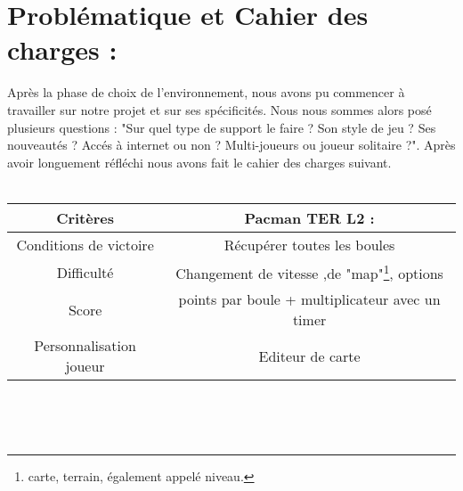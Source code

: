 \documentclass[12pt,a4paper,article]{article} %
\begin{document}
\section{Problématique et Cahier des charges :}

Après la phase de choix de l'environnement, nous avons pu commencer à travailler sur notre projet et sur ses spécificités. Nous nous sommes alors posé plusieurs questions : "Sur quel type de support le faire ? Son style de jeu ? Ses nouveautés ? Accés à internet ou non ? Multi-joueurs ou joueur solitaire ?". Après avoir longuement réfléchi nous avons fait le cahier des charges suivant.\\
\\

\noindent
{\small \begin{tabular}{|c|c|}
  \hline
  Critères  &  Pacman TER L2 :  \\
  \hline
  Conditions de victoire &Récupérer toutes les boules\\
  Difficulté & Changement de vitesse ,de "map"\footnote{carte, terrain, \'egalement appel\'e niveau.}, options\\
  Score & points par boule + multiplicateur avec un timer\\
  Personnalisation joueur &Editeur de carte\\
  \hline
\end{tabular}\\}
\\
\noindent
\end{document}

